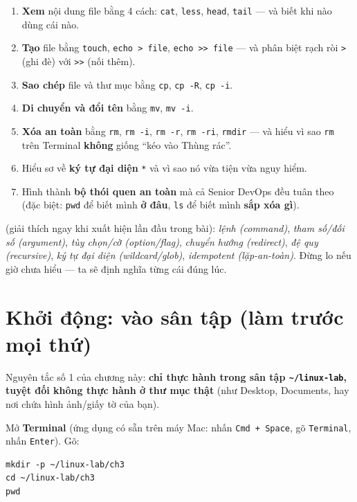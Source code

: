 \documentclass[12pt,a4paper]{article}
\newcommand{\cmd}[1]{\texttt{#1}}
\begin{document}
\begin{enumerate}[leftmargin=2em]
\item \textbf{Xem} nội dung file bằng 4 cách: \cmd{cat}, \cmd{less}, \cmd{head}, \cmd{tail} --- và biết khi nào dùng cái nào.
\item \textbf{Tạo} file bằng \cmd{touch}, \cmd{echo > file}, \cmd{echo >> file} --- và phân biệt rạch ròi \cmd{>} (ghi đè) với \cmd{>>} (nối thêm).
\item \textbf{Sao chép} file và thư mục bằng \cmd{cp}, \cmd{cp -R}, \cmd{cp -i}.
\item \textbf{Di chuyển và đổi tên} bằng \cmd{mv}, \cmd{mv -i}.
\item \textbf{Xóa an toàn} bằng \cmd{rm}, \cmd{rm -i}, \cmd{rm -r}, \cmd{rm -ri}, \cmd{rmdir} --- và hiểu vì sao \cmd{rm} trên Terminal \textbf{không} giống ``kéo vào Thùng rác''.
\item Hiểu sơ về \textbf{ký tự đại diện} \cmd{*} và vì sao nó vừa tiện vừa nguy hiểm.
\item Hình thành \textbf{bộ thói quen an toàn} mà cả Senior DevOps đều tuân theo (đặc biệt: \cmd{pwd} để biết mình \textbf{ở đâu}, \cmd{ls} để biết mình \textbf{sắp xóa gì}).
\end{enumerate}

\begin{notebox}[title={Ghi chú: Thuật ngữ sẽ gặp}]
(giải thích ngay khi xuất hiện lần đầu trong bài): \textit{lệnh (command)}, \textit{tham số/đối số (argument)}, \textit{tùy chọn/cờ (option/flag)}, \textit{chuyển hướng (redirect)}, \textit{đệ quy (recursive)}, \textit{ký tự đại diện (wildcard/glob)}, \textit{idempotent (lặp-an-toàn)}. Đừng lo nếu giờ chưa hiểu --- ta sẽ định nghĩa từng cái đúng lúc.
\end{notebox}

\section{Khởi động: vào sân tập (làm trước mọi thứ)}

Nguyên tắc số 1 của chương này: \textbf{chỉ thực hành trong sân tập \cmd{\textasciitilde/linux-lab}, tuyệt đối không thực hành ở thư mục thật} (như Desktop, Documents, hay nơi chứa hình ảnh/giấy tờ của bạn).

Mở \textbf{Terminal} (ứng dụng có sẵn trên máy Mac: nhấn \cmd{Cmd + Space}, gõ \cmd{Terminal}, nhấn \cmd{Enter}). Gõ:

\begin{Verbatim}
mkdir -p ~/linux-lab/ch3
cd ~/linux-lab/ch3
pwd
\end{Verbatim}
\end{document}
